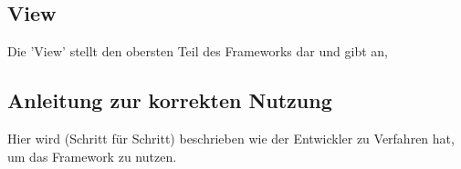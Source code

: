 \subsection{View}
Die 'View' stellt den obersten Teil des Frameworks dar und gibt an, 

\subsection{Anleitung zur korrekten Nutzung}
Hier wird (Schritt für Schritt) beschrieben wie der Entwickler zu Verfahren hat, um das Framework zu nutzen.